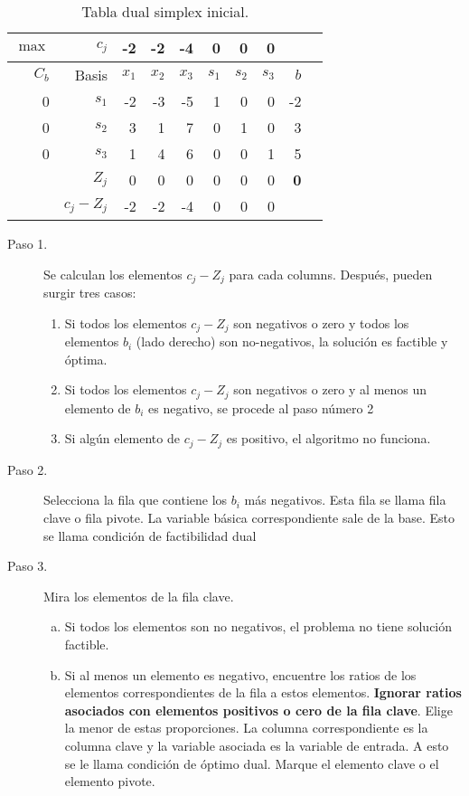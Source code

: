 \documentclass[letter]{article}
\begin{document}
\begin{table}[h]
\caption{Tabla dual simplex inicial.}
      \centering
      \begin{tabular}{rrrrrrrrrr}
        \toprule
        $\max$&$c_j$&-2&-2&-4&0&0&0&\\
        \midrule
        $C_b$&Basis&$x_1$&$x_2$&$x_3$&$s_1$&$s_2$&$s_3$&$b$&\\
        \midrule
        0&\color{blue}$s_1$&-2&-3&-5&1&0&0&-2& \\
        0&$s_2$&3&1&7&0&1&0&3&\\
        0&$s_3$&1&4&6&0&0&1&5&\\
        \midrule
              &$Z_j$&0&0&0&0&0&0&\cellcolor{yellow}\textbf{0}&\\
              &$c_j - Z_j$&-2&-2&-4&0&0&0&\\
        \bottomrule
      \end{tabular}
    \end{table}
    


    \begin{description}
    \item[Paso 1.] Se calculan los elementos $c_j - Z_j$ para cada columns. Después, pueden surgir tres casos:
  \begin{enumerate}  
  \item  Si todos los elementos $c_j - Z_j$ son negativos o zero y todos los elementos $b_i$ (lado derecho) son no-negativos, la solución es factible y óptima.
\item Si todos los elementos $c_j - Z_j$ son negativos o zero y al menos un elemento de $b_i$ es negativo, se procede al paso número 2
\item  Si algún elemento de $c_j - Z_j$ es positivo, el algoritmo no funciona.
  \end{enumerate}
\item[Paso 2.] Selecciona la fila que contiene los $b_i$ más negativos. Esta fila se llama fila clave o fila pivote. La variable básica correspondiente sale de la base. Esto se llama condición de factibilidad dual
\item[Paso 3.]  Mira los elementos de la fila clave.
  \begin{enumerate}[a)]
  \item  Si todos los elementos son no negativos, el problema no tiene solución factible.
  \item  Si al menos un elemento es negativo, encuentre los ratios de los elementos correspondientes de la fila a estos elementos. \textbf{Ignorar ratios asociados con elementos positivos o cero de la fila clave}. Elige la menor de estas proporciones. La columna correspondiente es la columna clave y la variable asociada es la variable de entrada. A esto se le llama condición de óptimo dual. Marque el elemento clave o el elemento pivote.
  \end{enumerate}
\end{description}
\end{document}
